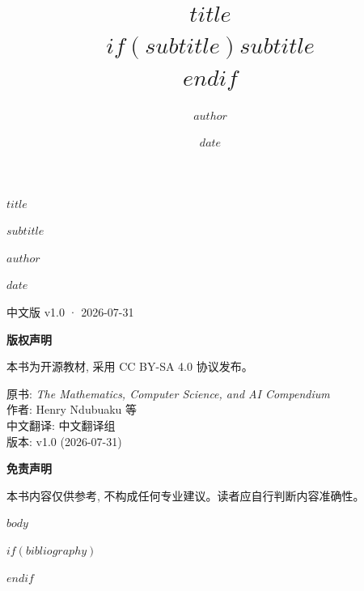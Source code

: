 \documentclass[$if(fontsize)$$fontsize$,$endif$$if(papersize)$$papersize$,$endif$]{book}
\title{$title$\\$if(subtitle)${\large $subtitle$}\\$endif$}
\author{$author$}
\date{$date$}
\begin{document}
\begin{titlepage}
\centering
\vspace*{3cm}
{\Huge\bfseries\color{chaptercolor} $title$\par}
\vspace{0.5cm}
{\Large\color{sectioncolor} $subtitle$\par}
\vspace{3cm}
{\large $author$\par}
\vspace{1cm}
{\large $date$\par}
\vfill
{\small 中文版 v1.0 · 2026-07-31\par}
\end{titlepage}

\newpage
\thispagestyle{empty}
\noindent\textbf{版权声明}

本书为开源教材, 采用 CC BY-SA 4.0 协议发布。

原书: \textit{The Mathematics, Computer Science, and AI Compendium} \\
作者: Henry Ndubuaku 等 \\
中文翻译: 中文翻译组 \\
版本: v1.0 (2026-07-31)

\vspace{1cm}
\noindent\textbf{免责声明}

本书内容仅供参考, 不构成任何专业建议。读者应自行判断内容准确性。

\newpage
\tableofcontents
\listoffigures
\listoftables

$body$

$if(bibliography)$
\newpage

$endif$
\end{document}

